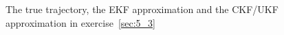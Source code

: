 \documentclass[a4paper,oneside,article]{memoir}
\begin{document}
\begin{figure}[htb]
  \begin{adjustwidth}{-2in}{-2in}
	  \centering
  \end{adjustwidth}
  	  \caption{The true trajectory, the EKF approximation and the CKF/UKF approximation in exercise~\ref{sec:5_3}}
	  \label{fig:ex_5_3}
\end{figure}


\begin{table}[h]
	\centering
	
	\label{table:rmse5_3}
\end{table}
\end{document}
